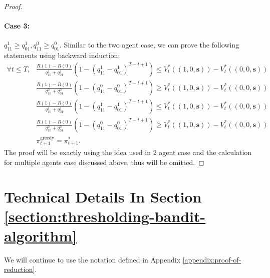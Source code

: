 \begin{proof}
\paragraph{Case 3:} $q^1_{11}\geq q^1_{01}, q^0_{11}\geq q^0_{01}$. Similar to the two agent case, we can prove the following statements using backward induction:
\begin{align}
    \forall t\leq T, &\frac{R(1)-R(0)}{q^1_{10}+q^1_{01}}\left(1-\left(q^1_{11}-q^1_{01}\right)^{T-t+1}\right)\leq V_t^*\left((1,0,\bm{s})\right)-V_t^*((0,0,\bm{s}))\label{eq:lowerbound-11-case3-ma}\\
    &\frac{R(1)-R(0)}{q^0_{10}+q^0_{01}}\left(1-\left(q^0_{11}-q^0_{01}\right)^{T-t+1}\right)\geq V_t^*\left((1,0,\bm{s})\right)-V_t^*((0,0,\bm{s}))\label{eq:upperbound-11-case3-ma}\\
    &\frac{R(1)-R(0)}{q^1_{10}+q^1_{01}}\left(1-\left(q^1_{11}-q^1_{01}\right)^{T-t+1}\right)\leq V_t^*\left((1,0,\bm{s})\right)-V_t^*((0,0,\bm{s}))\label{eq:lowerbound-10-case3-ma}\\
    &\frac{R(1)-R(0)}{q^0_{10}+q^0_{01}}\left(1-\left(q^0_{11}-q^0_{01}\right)^{T-t+1}\right)\geq V_t^*\left((1,0,\bm{s})\right)-V_t^*((0,0,\bm{s}))\label{eq:upperbound-10-case3-ma}\\
    &\pi_{t+1}^{\text{greedy}}=\pi_{t+1}^*.\label{eq:optimality-lemma3-case3-ma}
\end{align}
The proof will be exactly using the idea used in 2 agent case and the calculation for multiple agents case discussed above, thus will be omitted.
\end{proof}


\section{Technical Details In Section \ref{section:thresholding-bandit-algorithm}}\label{app:proof-thresholding}
We will continue to use the notation defined in Appendix \ref{appendix:proof-of-reduction}.
